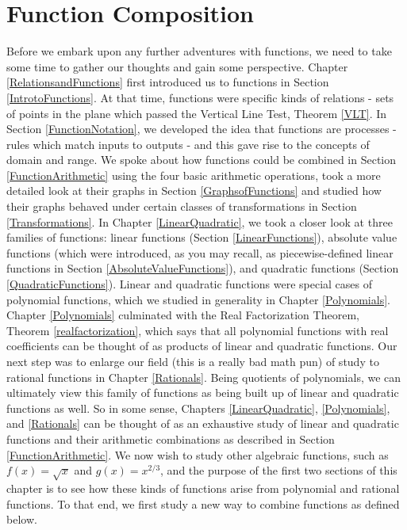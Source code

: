 \section{Function Composition}

\label{FunctionComposition}

Before we embark upon any further adventures with functions, we need to take some time to gather our thoughts and gain some perspective.  Chapter \ref{RelationsandFunctions} first introduced us to functions in Section \ref{IntrotoFunctions}.  At that time, functions were specific kinds of relations - sets of points in the plane which passed the Vertical Line Test, Theorem \ref{VLT}.  In Section \ref{FunctionNotation}, we developed the idea that functions are processes - rules which match inputs to outputs - and this gave rise to the concepts of domain and range.  We spoke about how functions could be combined in Section \ref{FunctionArithmetic} using the four basic arithmetic operations, took a more detailed look at their graphs in Section \ref{GraphsofFunctions} and studied how their graphs behaved under certain classes of transformations in Section \ref{Transformations}.  In Chapter \ref{LinearQuadratic}, we took a closer look at three families of functions: linear functions (Section \ref{LinearFunctions}), absolute value functions (which were introduced, as you may recall, as piecewise-defined linear functions in Section \ref{AbsoluteValueFunctions}), and quadratic functions (Section \ref{QuadraticFunctions}).  Linear and quadratic functions were special cases of polynomial functions, which we studied in generality in Chapter \ref{Polynomials}. Chapter \ref{Polynomials} culminated with the Real Factorization Theorem, Theorem \ref{realfactorization}, which says that all polynomial functions with real coefficients can be thought of as products of linear and quadratic functions.  Our next step was to enlarge our field (this is a really bad math pun) of study to rational functions in Chapter \ref{Rationals}.  Being quotients of polynomials, we can ultimately view this family of functions as being built up of linear and quadratic functions as well.  So in some sense, Chapters \ref{LinearQuadratic}, \ref{Polynomials}, and \ref{Rationals} can be thought of as an exhaustive study of linear and quadratic functions and their arithmetic combinations as described in Section \ref{FunctionArithmetic}. We now wish to study other algebraic functions, such as $f(x) = \sqrt{x}$ and $g(x) = x^{2/3}$, and the purpose of the first two sections of this chapter is to see how these kinds of functions arise from polynomial and rational functions.  To that end, we first study a new way to combine functions as defined below.

